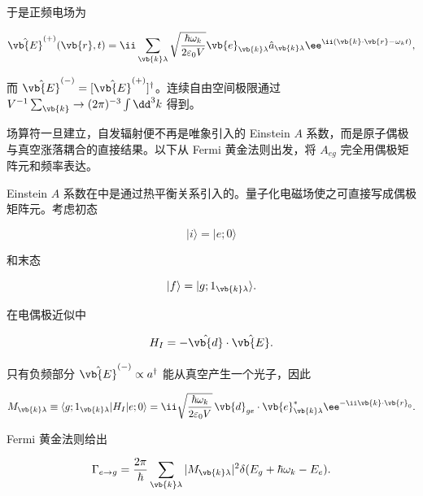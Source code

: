 于是正频电场为

\begin{equation}
\hat{\vb{E}}^{(+)}(\vb{r},t)
=\ii\sum_{\vb{k}\lambda}
\sqrt{\frac{\hbar\omega_k}{2\varepsilon_0V}}
\vb{e}_{\vb{k}\lambda}
\hat a_{\vb{k}\lambda}
 \ee^{\ii(\vb{k}\cdot\vb{r}-\omega_kt)},
\label{eq:field-expansion}
\end{equation}

而 \(\hat{\vb{E}}^{(-)}=[\hat{\vb{E}}^{(+)}]^\dagger\)。连续自由空间极限通过 \(V^{-1}\sum_{\vb{k}}\to(2\pi)^{-3}\int\dd^3 k\) 得到。

场算符一旦建立，自发辐射便不再是唯象引入的 Einstein $A$ 系数，而是原子偶极与真空涨落耦合的直接结果。以下从 Fermi 黄金法则出发，将 $A_{eg}$ 完全用偶极矩阵元和频率表达。

Einstein \(A\) 系数在中是通过热平衡关系引入的。量子化电磁场使之可直接写成偶极矩阵元。考虑初态

\[
|i\rangle=|e;0\rangle
\]

和末态

\[
|f\rangle=|g;1_{\vb{k}\lambda}\rangle.
\]

在电偶极近似中

\[
H_I=-\hat{\vb{d}}\cdot\hat{\vb{E}}.
\]

只有负频部分 \(\hat{\vb{E}}^{(-)}\propto a^\dagger\) 能从真空产生一个光子，因此

\[
M_{\vb{k}\lambda}
\equiv
\langle g;1_{\vb{k}\lambda}|H_I|e;0\rangle
=\ii
\sqrt{\frac{\hbar\omega_k}{2\varepsilon_0V}}
\,\vb{d}_{ge}\cdot\vb{e}_{\vb{k}\lambda}^*
 \ee^{-\ii\vb{k}\cdot\vb{r}_0}.
\]

Fermi 黄金法则给出

\[
\Gamma_{e\to g}
=\frac{2\pi}{\hbar}
\sum_{\vb{k}\lambda}
|M_{\vb{k}\lambda}|^2
\delta(E_g+\hbar\omega_k-E_e).
\]

